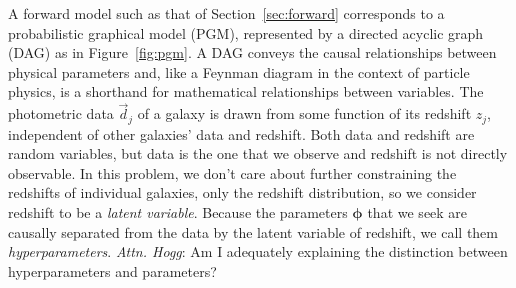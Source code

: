 \documentclass[iop]{emulateapj}
\newcommand{\todo}[3]{{\color{#2}\emph{#1}: #3}}
\newcommand{\dwh}[1]{\todo{Attn. Hogg}{blue}{#1}}
\newcommand{\Sect}[1]{Section~\ref{#1}}
\newcommand{\Fig}[1]{Figure~\ref{#1}}
\newcommand{\data}{\ensuremath{\vec{d}}}%
\newcommand{\bvec}[1]{\ensuremath{\boldsymbol{#1}}}%
\newcommand{\ndphi}{\bvec{\phi}}
\begin{document}
A forward model such as that of \Sect{sec:forward} corresponds to a probabilistic graphical model (PGM), represented by a directed acyclic graph (DAG) as in \Fig{fig:pgm}.
A DAG conveys the causal relationships between physical parameters and, like a Feynman diagram in the context of particle physics, is a shorthand for mathematical relationships between variables.
The photometric data $\data_{j}$ of a galaxy is drawn from some function of its redshift $z_{j}$, independent of other galaxies' data and redshift.
Both data and redshift are random variables, but data is the one that we observe and redshift is not directly observable.
In this problem, we don't care about further constraining the redshifts of individual galaxies, only the redshift distribution, so we consider redshift to be a \textit{latent variable}.
Because the parameters $\ndphi$ that we seek are causally separated from the data by the latent variable of redshift, we call them \textit{hyperparameters}.
\dwh{Am I adequately explaining the distinction between hyperparameters and parameters?}
\end{document}
